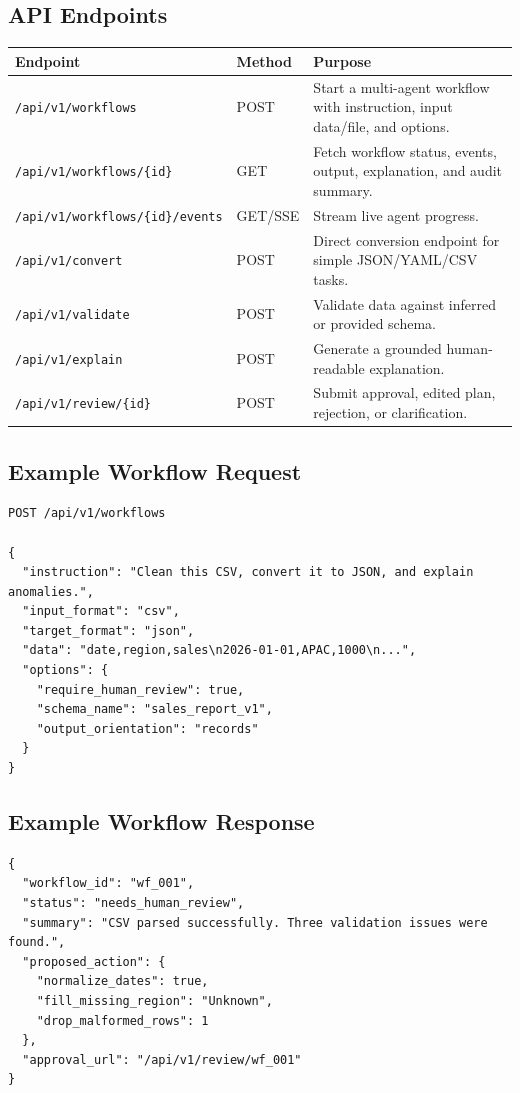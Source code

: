 \subsection{API Endpoints}

\begin{tabularx}{\textwidth}{p{}p{}X}
\toprule
\textbf{Endpoint} & \textbf{Method} & \textbf{Purpose} \\
\midrule
\texttt{/api/v1/workflows} & POST & Start a multi-agent workflow with instruction, input data/file, and options. \\
\texttt{/api/v1/workflows/\{id\}} & GET & Fetch workflow status, events, output, explanation, and audit summary. \\
\texttt{/api/v1/workflows/\{id\}/events} & GET/SSE & Stream live agent progress. \\
\texttt{/api/v1/convert} & POST & Direct conversion endpoint for simple JSON/YAML/CSV tasks. \\
\texttt{/api/v1/validate} & POST & Validate data against inferred or provided schema. \\
\texttt{/api/v1/explain} & POST & Generate a grounded human-readable explanation. \\
\texttt{/api/v1/review/\{id\}} & POST & Submit approval, edited plan, rejection, or clarification. \\
\bottomrule
\end{tabularx}

\subsection{Example Workflow Request}

\begin{verbatim}
POST /api/v1/workflows

{
  "instruction": "Clean this CSV, convert it to JSON, and explain anomalies.",
  "input_format": "csv",
  "target_format": "json",
  "data": "date,region,sales\n2026-01-01,APAC,1000\n...",
  "options": {
    "require_human_review": true,
    "schema_name": "sales_report_v1",
    "output_orientation": "records"
  }
}
\end{verbatim}

\subsection{Example Workflow Response}

\begin{verbatim}
{
  "workflow_id": "wf_001",
  "status": "needs_human_review",
  "summary": "CSV parsed successfully. Three validation issues were found.",
  "proposed_action": {
    "normalize_dates": true,
    "fill_missing_region": "Unknown",
    "drop_malformed_rows": 1
  },
  "approval_url": "/api/v1/review/wf_001"
}
\end{verbatim}
